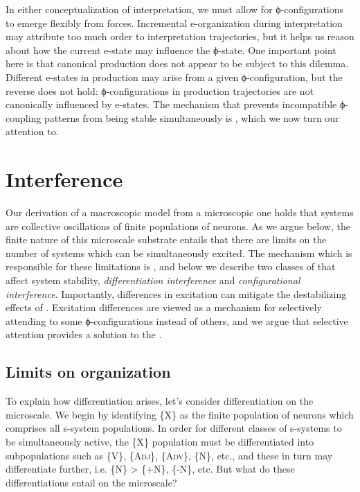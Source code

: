   In either conceptualization of interpretation, we must allow for ϕ-con\-fig\-u\-ra\-tions to emerge flexibly from  forces. Incremental e-organization during interpretation may attribute too much order to interpretation trajectories, but it helps us reason about how the current e-state may influence the ϕ-state. One important point here is that canonical production does not appear to be subject to this dilemma. Different e-states in production may arise from a given ϕ-con\-fig\-u\-ra\-tion, but the reverse does not hold: ϕ-con\-fig\-u\-ra\-tions in production trajectories are not canonically influenced by e-states. The mechanism that prevents incompatible ϕ-coupling patterns from being stable simultaneously is , which we now turn our attention to.

\section{Interference}

Our derivation of a macroscopic model from a microscopic one holds that systems are collective oscillations of finite populations of neurons. As we argue below, the finite nature of this microscale substrate entails that there are limits on the number of  systems which can be simultaneously excited. The mechanism which is responsible for these limitations is , and below we describe two classes of  that affect system stability, \textit{differentiation interference} and \textit{configurational interference}. Importantly, differences in excitation can mitigate the destabilizing effects of . Excitation differences are viewed as a mechanism for selectively attending to some ϕ-con\-fig\-u\-ra\-tions instead of others, and we argue that selective attention provides a solution to the .

\subsection{Limits on organization}

To explain how differentiation  arises, let's consider differentiation on the microscale. We begin by identifying \{X\} as the finite population of neurons which comprises all s-system populations. In order for different classes of s-systems to be simultaneously active, the \{X\} population must be differentiated into subpopulations such as \{V\}, \{A\textsc{dj}\}, \{A\textsc{dv}\}, \{N\}, etc., and these in turn may differentiate further, i.e. \{N\} > \{+N\}, \{-N\}, etc. But what do these differentiations entail on the microscale?

